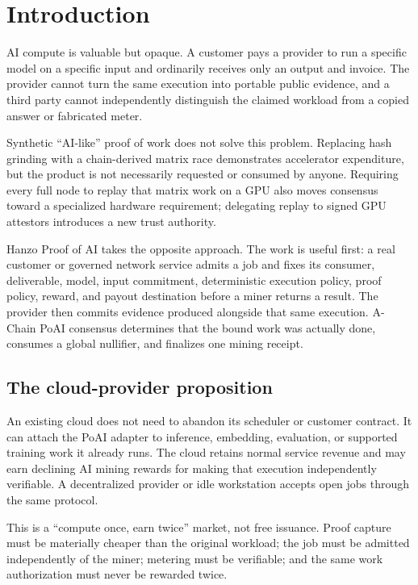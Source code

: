 \section{Introduction}
\label{sec:intro}

AI compute is valuable but opaque. A customer pays a provider to run a specific
model on a specific input and ordinarily receives only an output and invoice.
The provider cannot turn the same execution into portable public evidence, and a
third party cannot independently distinguish the claimed workload from a copied
answer or fabricated meter.

Synthetic ``AI-like'' proof of work does not solve this problem. Replacing hash
grinding with a chain-derived matrix race demonstrates accelerator expenditure,
but the product is not necessarily requested or consumed by anyone. Requiring
every full node to replay that matrix work on a GPU also moves consensus toward a
specialized hardware requirement; delegating replay to signed GPU attestors
introduces a new trust authority.

Hanzo Proof of AI takes the opposite approach. The work is useful first: a real
customer or governed network service admits a job and fixes its consumer,
deliverable, model, input commitment, deterministic execution policy, proof
policy, reward, and payout destination before a miner returns a result. The
provider then commits evidence produced alongside that same execution. A-Chain
PoAI consensus determines that the bound work was actually done, consumes a
global nullifier, and finalizes one mining receipt.

\subsection{The cloud-provider proposition}

An existing cloud does not need to abandon its scheduler or customer contract.
It can attach the PoAI adapter to inference, embedding, evaluation, or supported
training work it already runs. The cloud retains normal service revenue and may
earn declining AI mining rewards for making that execution independently
verifiable. A decentralized provider or idle workstation accepts open jobs
through the same protocol.

This is a ``compute once, earn twice'' market, not free issuance. Proof capture
must be materially cheaper than the original workload; the job must be admitted
independently of the miner; metering must be verifiable; and the same work
authorization must never be rewarded twice.

